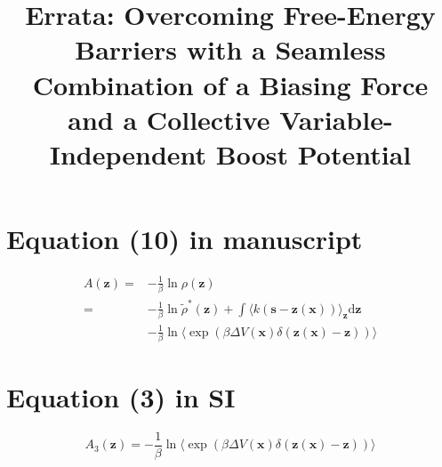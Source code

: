 \documentclass[]{article}
\title{Errata: Overcoming Free-Energy Barriers with a Seamless Combination of a
Biasing Force and a Collective Variable-Independent Boost Potential}
\begin{document}
\maketitle

\section{Equation (10) in manuscript}

\begin{equation}\label{eq:reweighting_gawtm_eabf_pmf}
\begin{split}
A(\mathbf{z})=&-\frac{1}{\beta}\ln\rho(\mathbf{z})\\
=&-\frac{1}{\beta}\ln\tilde{\rho}^*(\mathbf{z})+\int\langle 
k(\mathbf{s}-\mathbf{z}(\mathbf{x})) 
\rangle_{\mathbf{z}}\mathrm{d}\mathbf{z}\\
&-\frac{1}{\beta}\ln\langle\exp(\beta\Delta V(\mathbf{x})\delta 
(\mathbf{z}(\mathbf{x})-\mathbf{z}))\rangle
\end{split}\nonumber
\end{equation}

\section{Equation (3) in SI}
\begin{equation}\label{eq:pmf_2_exp}
A_{3}(\mathbf{z})=-\frac{1}{\beta}\ln\langle\exp(\beta\Delta V(\mathbf{x})\delta 
(\mathbf{z}(\mathbf{x})-\mathbf{z}))\rangle\nonumber
\end{equation}
\end{document}

